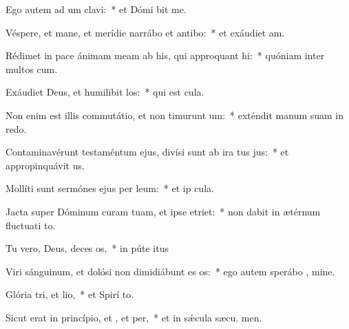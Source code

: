 \item Ego autem ad um clavi:~* et Dómi bit me.
\item Véspere, et mane, et merídie narrábo et antibo:~* et exáudiet  am.
\item Rédimet in pace ánimam meam ab his, qui approquant hi:~* quóniam inter multos  cum.
\item Exáudiet Deus, et humilibit los:~* qui est  cula.
\item Non enim est illis commutátio, et non timurunt um:~* exténdit manum suam in redo.
\item Contaminavérunt testaméntum ejus, divísi sunt ab ira tus jus:~* et appropinquávit  us.
\item Mollíti sunt sermónes ejus per leum:~* et ip  cula.
\item Jacta super Dóminum curam tuam, et ipse  etriet:~* non dabit in ætérnum fluctuati to.
\item Tu vero, Deus, deces os,~* in púte itus
\item Viri sánguinum, et dolósi non dimidiábunt es os:~* ego autem sperábo  , mine.
\item Glória tri, et lio,~* et Spirí to.
\item Sicut erat in princípio, et , et per,~* et in sǽcula sæcu. men.
